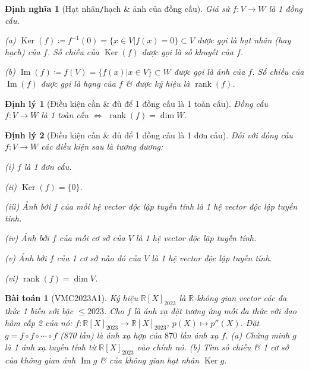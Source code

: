 \documentclass{article}
\newtheorem{baitoan}{Bài toán}
\newtheorem{dinhly}{Định lý}
\newtheorem{dinhnghia}{Định nghĩa}
\begin{document}
\begin{dinhnghia}[Hạt nhân{\tt/}hạch \& ảnh của đồng cấu]
	Giả sử $f:V\to W$ là 1 đồng cấu.
	\item(a) $\operatorname{Ker}(f)\coloneqq f^{-1}(0) = \{x\in V|f(x) = 0\}\subset V$ được gọi là \emph{hạt nhân} (hay \emph{hạch}) của $f$. Số chiều của $\operatorname{Ker}(f)$ được gọi là \emph{số khuyết} của $f$.
	\item(b) $\operatorname{Im}(f)\coloneqq f(V) = \{f(x)|x\in V\}\subset W$ được gọi là \emph{ảnh} của $f$. Số chiều của $\operatorname{Im}(f)$ được gọi là \emph{hạng} của $f$ \& được ký hiệu là $\operatorname{rank}(f)$.
\end{dinhnghia}

\begin{dinhly}[Điều kiện cần \& đủ để 1 đồng cấu là 1 toàn cấu]
	Đồng cấu $f:V\to W$ là 1 toàn cấu $\Leftrightarrow$ $\operatorname{rank}(f) = \dim W$.
\end{dinhly}

\begin{dinhly}[Điều kiện cần \& đủ để 1 đồng cấu là 1 đơn cấu]
	Đối với đồng cấu $f:V\to W$ các điều kiện sau là tương đương:
	\item(i) $f$ là 1 đơn cấu.
	\item(ii) $\operatorname{Ker}(f) = \{0\}$.
	\item(iii) Ảnh bởi $f$ của mỗi hệ vector độc lập tuyến tính là 1 hệ vector độc lập tuyến tính.
	\item(iv) Ảnh bởi $f$ của mỗi cơ sở của $V$ là 1 hệ vector độc lập tuyến tính.
	\item(v) Ảnh bởi $f$ của 1 cơ sở nào đó của $V$ là 1 hệ vector độc lập tuyến tính.
	\item(vi) $\operatorname{rank}(f) = \dim V$.
\end{dinhly}

\begin{baitoan}[VMC2023A1]
	Ký hiệu $\mathbb{R}[X]_{2023}$ là $\mathbb{R}$-không gian vector các đa thức 1 biến với bậc $\le2023$. Cho $f$ là ánh xạ đặt tương ứng mỗi đa thức với đạo hàm cấp 2 của nó: $f:\mathbb{R}[X]_{2023}\to\mathbb{R}[X]_{2023}$, $p(X)\mapsto p''(X)$. Đặt $g = f\circ f\circ\cdots\circ f$ (870 lần) là ánh xạ hợp của $870$ lần ánh xạ $f$. (a) Chứng minh $g$ là 1 ánh xạ tuyến tính từ $\mathbb{R}[X]_{2023}$ vào chính nó. (b) Tìm số chiều \& 1 cơ sở của không gian ảnh $\operatorname{Im}g$ \& của không gian hạt nhân $\operatorname{Ker}g$.
\end{baitoan}
\end{document}
